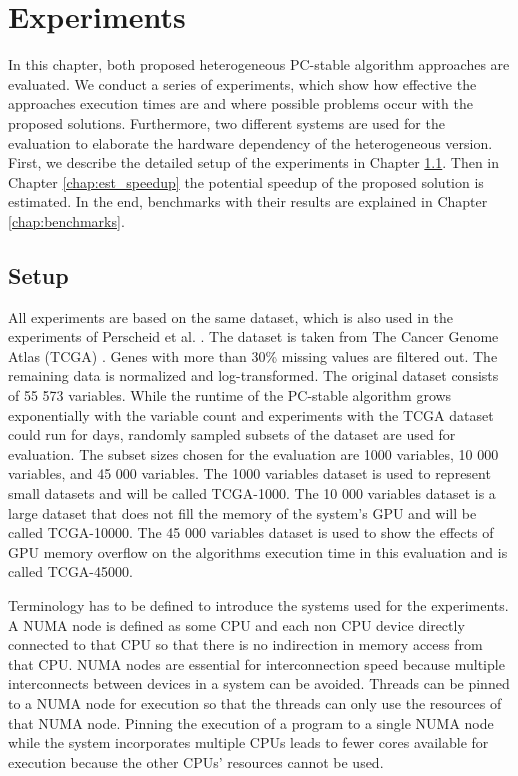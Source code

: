 \chapter{Experiments}
\label{chap:experiments}
In this chapter, both proposed heterogeneous PC-stable algorithm approaches are evaluated. We conduct a series of experiments, which show how effective the approaches execution times are and where possible problems occur with the proposed solutions. Furthermore, two different systems are used for the evaluation to elaborate the hardware dependency of the heterogeneous version. First, we describe the detailed setup of the experiments in Chapter \ref{chap:setup}. Then in Chapter \ref{chap:est_speedup} the potential speedup of the proposed solution is estimated. In the end, benchmarks with their results are explained in Chapter \ref{chap:benchmarks}.

\section{Setup}
\label{chap:setup}
All experiments are based on the same dataset, which is also used in the experiments of Perscheid et al. \cite{perscheidIntegrativeGeneSelection2018}. The dataset is taken from The Cancer Genome Atlas (TCGA) \cite{weinsteinCancerGenomeAtlas2013}. Genes with more than 30\% missing values are filtered out. The remaining data is normalized and log-transformed. The original dataset consists of 55 573 variables. While the runtime of the PC-stable algorithm grows exponentially with the variable count and experiments with the TCGA dataset could run for days, randomly sampled subsets of the dataset are used for evaluation. The subset sizes chosen for the evaluation are 1000 variables, 10 000 variables, and 45 000 variables. The 1000 variables dataset is used to represent small datasets and will be called TCGA-1000. The 10 000 variables dataset is a large dataset that does not fill the memory of the system's GPU and will be called TCGA-10000. The 45 000 variables dataset is used to show the effects of GPU memory overflow on the algorithms execution time in this evaluation and is called TCGA-45000.

Terminology has to be defined to introduce the systems used for the experiments. A NUMA node is defined as some CPU and each non CPU device directly connected to that CPU so that there is no indirection in memory access from that CPU. NUMA nodes are essential for interconnection speed because multiple interconnects between devices in a system can be avoided. Threads can be pinned to a NUMA node for execution so that the threads can only use the resources of that NUMA node. Pinning the execution of a program to a single NUMA node while the system incorporates multiple CPUs leads to fewer cores available for execution because the other CPUs' resources cannot be used.

